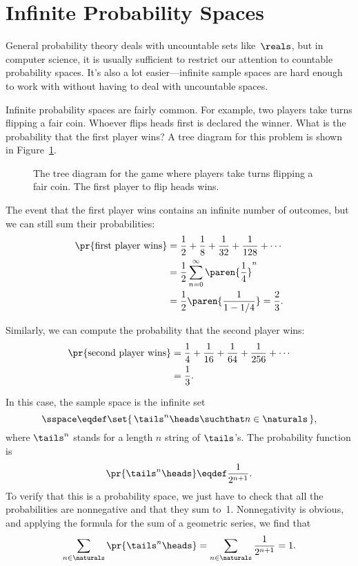 \section{Infinite Probability Spaces}

General probability theory deals with uncountable sets like~$\reals$,
but in computer science, it is usually sufficient to restrict our
attention to countable probability spaces.  It's also a lot
easier---infinite sample spaces are hard enough to work with without
having to deal with uncountable spaces.

Infinite probability spaces are fairly common.  For example, two
players take turns flipping a fair coin.  Whoever flips heads first is
declared the winner.  What is the probability that the first player
wins?  A tree diagram for this problem is shown in
Figure~\ref{fig:14A15}.

\begin{figure}


\caption{The tree diagram for the game where players take turns
  flipping a fair coin.  The first player to flip heads wins.}

\label{fig:14A15}

\end{figure}

The event that the first player wins contains an infinite number of
outcomes, but we can still sum their probabilities:
\begin{align*}
\pr{\text{first player wins}}
    & = \frac{1}{2} + \frac{1}{8} + \frac{1}{32} + \frac{1}{128} + \cdots \\
    & = \frac{1}{2} \sum_{n=0}^\infty \paren{\frac{1}{4}}^n \\
    & = \frac{1}{2}\paren{\frac{1}{1-1/4}} = \frac{2}{3}.
\end{align*}

Similarly, we can compute the probability that the second player wins:
\begin{align*}
\pr{\text{second player wins}}
    & = \frac{1}{4} + \frac{1}{16} + \frac{1}{64} + \frac{1}{256}
                      + \cdots \\
    & = \frac{1}{3}.
\end{align*}

In this case, the sample space is the infinite set
\[
    \sspace \eqdef \set{\, \tails^n\heads \suchthat n \in \naturals \,},
\]
where $\tails^n$ stands for a length $n$ string of $\tails$'s.
The probability function is
\[
\pr{\tails^n\heads} \eqdef \frac{1}{2^{n+1}}.
\]
To verify that this is a probability space, we just have to check that
all the probabilities are nonnegative and that they sum to~1.
Nonnegativity is obvious, and applying the formula for the sum of a
geometric series, we find that
\begin{equation*}
\sum_{n \in \naturals} \pr{\tails^n\heads}
    = \sum_{n \in \naturals} \frac{1}{2^{n+1}} \\
    = 1.
\end{equation*}

